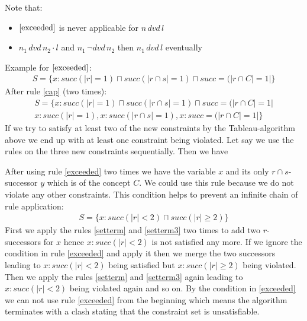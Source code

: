 \documentclass[a4paper,11pt]{scrartcl}
\theoremstyle{break}
\begin{document}
Note that:
\begin{itemize}
\item $\ref{exceeded}$ is never applicable for $n\, dvd\, l$
\item $n_1\,dvd\,n_2\cdot l$ and $n_1\,\neg dvd\,n_2$ then $n_1\,dvd\,l$ eventually
\end{itemize}
Example for $\ref{exceeded}$:
\begin{align}
S=\{x:succ(|r|=1)\sqcap succ(|r\cap s|=1)\sqcap succ=(|r\cap C|=1|\}
\end{align}
After rule \ref{cap} (two times):
\begin{align*}
S=\{x:succ(|r|=1)\sqcap succ(|r\cap s|=1)\sqcap succ=(|r\cap C|=1|\\
x:succ(|r|=1), x:succ(|r\cap s|=1), x:succ=(|r\cap C|=1|
\}
\end{align*}
If we try to satisfy at least two of the new constraints by the Tableau-algorithm above we end up with at least one constraint being violated. Let say we use the rules on the three new constraints sequentially. Then we have 
\begin{figure}[H]
\centering
{}
\end{figure}
After using rule \ref{exceeded} two times we have the variable $x$ and its only $r\cap s$-successor $y$ which is of the concept $C$. We could use this rule because we do not violate any other constraints. This condition helps to prevent an infinite chain of rule application:
\begin{align}
S=\{x:succ(|r|<2)\sqcap succ(|r|\geq 2)\}	
\end{align}
First we apply the rules \ref{setterm} and \ref{setterm3} two times to add two $r$-successors for $x$ hence $x:succ(|r|<2)$ is not satisfied any more. If we ignore the condition in rule \ref{exceeded} and apply it then we merge the two successors leading to $x:succ(|r|<2)$ being satisfied but $x:succ(|r|\geq 2)$ being violated. Then we apply the rules \ref{setterm} and \ref{setterm3} again leading to $x:succ(|r|<2)$ being violated again and so on. By the condition in \ref{exceeded} we can not use rule \ref{exceeded} from the beginning which means the algorithm terminates with a clash stating that the constraint set is unsatisfiable.\\
\end{document}
